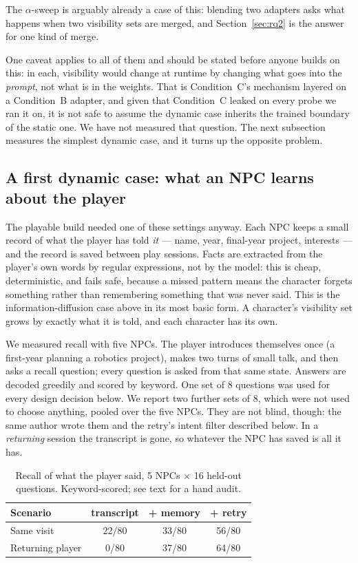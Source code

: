 \documentclass[conference]{IEEEtran}
\begin{document}
The $\alpha$-sweep is arguably already a case of this: blending two adapters
asks what happens when two visibility sets are merged, and
Section~\ref{sec:rq2} is the answer for one kind of merge.

One caveat applies to all of them and should be stated before anyone builds on
this: in each, visibility would change at runtime by changing what goes into
the \emph{prompt}, not what is in the weights. That is Condition~C's mechanism
layered on a Condition~B adapter, and given that Condition~C leaked on every
probe we ran it on, it is not safe to assume the dynamic case inherits the
trained boundary of the static one. We have not measured that question. The
next subsection measures the simplest dynamic case, and it turns up the
opposite problem.

\subsection{A first dynamic case: what an NPC learns about the player}
\label{sec:memory}

The playable build needed one of these settings anyway. Each NPC keeps a small
record of what the player has told \emph{it} --- name, year, final-year project,
interests --- and the record is saved between play sessions. Facts are
extracted from the player's own words by regular expressions, not by the model:
this is cheap, deterministic, and fails safe, because a missed pattern means
the character forgets something rather than remembering something that was
never said. This is the information-diffusion case above in its most basic
form. A character's visibility set grows by exactly what it is told, and each
character has its own.

We measured recall with five NPCs. The player introduces themselves once (a
first-year planning a robotics project), makes two turns of small talk, and
then asks a recall question; every question is asked from that same state.
Answers are decoded greedily and scored by keyword. One set of 8 questions was
used for every design decision below. We report two further sets of 8, which
were not used to choose anything, pooled over the five NPCs. They are not blind,
though: the same author wrote them and the retry's intent filter described
below. In a \emph{returning} session the transcript is gone, so whatever the
NPC has saved is all it has.

\begin{table}[t]
\caption{Recall of what the player said, 5 NPCs $\times$ 16 held-out questions.
Keyword-scored; see text for a hand audit.}
\label{tab:memory}
\centering
\begin{tabular}{lccc}
\toprule
Scenario & transcript & + memory & + retry \\
\midrule
Same visit       & 22/80 & 33/80 & 56/80 \\
Returning player & 0/80  & 37/80 & 64/80 \\
\bottomrule
\end{tabular}
\end{table}
\end{document}
